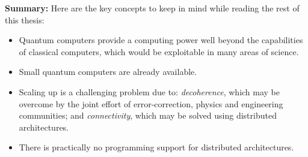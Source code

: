 \begin{mdframed}[backgroundcolor=gray!20,leftmargin=20pt,rightmargin=20pt, innerbottommargin=10pt] 
\small
\textbf{Summary:} Here are the key concepts to keep in mind while reading the rest of this thesis:
\begin{itemize}
  \item Quantum computers provide a computing power well beyond the capabilities of classical computers, which would be exploitable in many areas of science.
  \item Small quantum computers are already available. 
  \item Scaling up is a challenging problem due to: \textit{decoherence}, which may be overcome by the joint effort of error-correction, physics and engineering communities; and \textit{connectivity}, which may be solved using distributed architectures.
  \item There is practically no programming support for distributed architectures.
\end{itemize}
\end{mdframed}